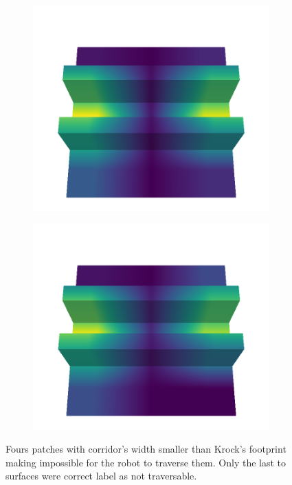 \begin{figure}[htbp]
\begin{subfigure}[b]{0.24\linewidth}
    \end{subfigure}
    \begin{subfigure}[b]{0.24\linewidth}
    \includegraphics[width=\linewidth]{../img/5/custom_patches/tunnel/all/08-3d-grad.png}
    \end{subfigure}
    \begin{subfigure}[b]{0.24\linewidth}
    \includegraphics[width=\linewidth]{../img/5/custom_patches/tunnel/all/09-3d-grad.png}
    \end{subfigure}
    \caption{Fours patches with corridor's width smaller than Krock's footprint making impossible for the robot to traverse them. Only the last to surfaces were correct label as not traversable.}
    \label{fig : tunnels-grad-cam}
\end{figure}
